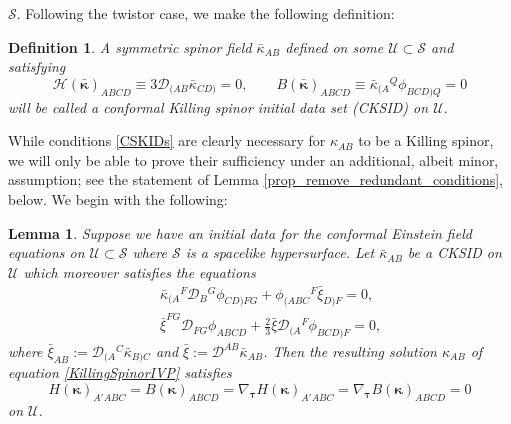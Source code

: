 \documentclass[10pt,a4paper]{article}
\theoremstyle{plain}
\newtheorem{lemma}{Lemma}
\newtheorem*{definition}{Definition}
\begin{document}
$\mathcal{S}$. Following the twistor case, we make the following
definition:
\begin{definition}{\em
A symmetric spinor field $\bar{\kappa}_{AB}$ defined on some
$\mathcal{U}\subset\mathcal{S}$ and satisfying
\begin{equation}
    \mathcal{H}(\bar{\bm\kappa})_{ABCD}\equiv
    3\mathcal{D}_{(AB}\bar{\kappa}_{CD)}=0,\qquad
    B(\bar{\bm\kappa})_{ABCD}\equiv
    \bar{\kappa}_{(A}{}^Q\phi_{BCD)Q}=0 \label{CSKIDs}
\end{equation}
will be called a \emph{conformal Killing spinor initial data set}
(\emph{CKSID}) on $\mathcal{U}$.}
\end{definition}
While conditions \eqref{CSKIDs} are clearly necessary for
$\kappa_{AB}$ to be a Killing spinor, we will only be able to prove
their sufficiency under an additional, albeit minor, assumption; see
the statement of Lemma \ref{prop_remove_redundant_conditions}, below.
We begin with the following:
\begin{lemma}\label{Lemma_initial_conditions}
  Suppose we have an initial data for the conformal Einstein field
  equations on $\mathcal{U}\subset\mathcal{S}$ where $\mathcal{S}$ is
  a spacelike hypersurface. Let $\bar{\kappa}_{AB}$ be a CKSID on
  $\mathcal{U}$ which moreover satisfies the equations
\begin{subequations}
\begin{eqnarray}
  && \bar{\kappa}_{(A}{}^{F}\mathcal{D}_{B}{}^{G}\phi_{CD)FG} +
  \phi_{(ABC}{}^{F}\bar{\xi}_{D)F} = 0,\label{RedundantCondition1}\\ &&
  \bar{\xi}^{FG}\mathcal{D}_{FG}\phi_{ABCD} +
  \tfrac{2}{3}\bar{\xi}\mathcal{D}_{(A}{}^F\phi_{BCD)F} =
  0, \label{RedundantCondition2}
\end{eqnarray}
\end{subequations}
where $\bar{\xi}_{AB}:=\mathcal{D}_{(A}{}^C\bar{\kappa}_{B)C}$ and
$\bar{\xi}:=\mathcal{D}^{AB}\bar{\kappa}_{AB}$. Then the resulting
solution $\kappa_{AB}$ of equation \eqref{KillingSpinorIVP} satisfies
\[H(\bm\kappa)_{A'ABC}=B(\bm\kappa)_{ABCD}=\nabla_{\bm\tau}H(\bm\kappa)_{A'ABC}=\nabla_{\bm\tau}B(\bm\kappa)_{ABCD}=0 \]
on $\mathcal{U}$. 
\end{lemma}
\end{document}
